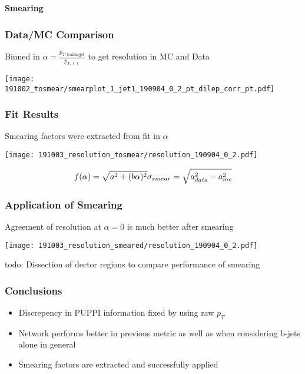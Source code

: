 \documentclass{beamer}
\newcommand{\beginbackup}{
  \newcounter{framenumbervorappendix}
  \setcounter{framenumbervorappendix}{\value{framenumber}}
}
\newcommand{\backupend}{
  \addtocounter{framenumbervorappendix}{-\value{framenumber}}
  \addtocounter{framenumber}{\value{framenumbervorappendix}}
}
\begin{document}
\begin{frame}
  \centering
    {\Huge \bf\sffamily Smearing}
\end{frame}


\begin{frame}
  \frametitle{Data/MC Comparison}

  Binned in $\alpha = \frac{p_{T, \mathrm{trailing jet}}}{p_{T, \ell\ell}}$
  to get resolution in MC and Data

  \centering
  \texttt{[image: 191002\_tosmear/smearplot\_1\_jet1\_190904\_0\_2\_pt\_dilep\_corr\_pt.pdf]}

\end{frame}

\begin{frame}
  \frametitle{Fit Results}

  Smearing factors were extracted from fit in $\alpha$

  \centering
  \texttt{[image: 191003\_resolution\_tosmear/resolution\_190904\_0\_2.pdf]}

  \[
  f(\alpha) = \sqrt{a^2 + (b \alpha)^2} \\
  \sigma_{smear} = \sqrt{a^2_{data} - a^2_{mc}}
  \]

\end{frame}


\begin{frame}
  \frametitle{Application of Smearing}

  Agreement of resolution at $\alpha = 0$ is much better after smearing

  \centering
  \texttt{[image: 191003\_resolution\_smeared/resolution\_190904\_0\_2.pdf]}

\end{frame}


\begin{frame}
  todo: Dissection of dector regions to compare performance of smearing
\end{frame}


\begin{frame}
  \frametitle{Conclusions}

  \begin{itemize}
  \item Discrepency in PUPPI information fixed by using raw $p_T$
  \item Network performs better in previous metric as well as when considering
    b-jets alone in general
  \item Smearing factors are extracted and successfully applied
  \end{itemize}

\end{frame}


\begin{comment}
\beginbackup

\begin{frame}
  \centering
    {\Huge \bf\sffamily Backup Slides}
\end{frame}



\backupend
\end{comment}
\end{document}
